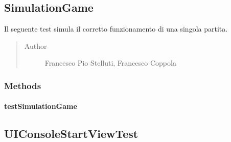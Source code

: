 \documentclass[letterpaper,10pt,italian,openany,oneside]{sphinxmanual}
\begin{document}
\subsection{SimulationGame}
\label{\detokenize{test/it/unicam/cs/pa/mastermind/test/SimulationGame:simulationgame}}\label{\detokenize{test/it/unicam/cs/pa/mastermind/test/SimulationGame::doc}}

\begin{fulllineitems}
\label{\detokenize{test/it/unicam/cs/pa/mastermind/test/SimulationGame:it.unicam.cs.pa.mastermind.test.SimulationGame}}
Il seguente test simula il corretto funzionamento di una singola partita.
\begin{quote}\begin{description}
\item[{Author}] \leavevmode
Francesco Pio Stelluti, Francesco Coppola

\end{description}\end{quote}

\end{fulllineitems}



\subsubsection{Methods}
\label{\detokenize{test/it/unicam/cs/pa/mastermind/test/SimulationGame:methods}}

\paragraph{testSimulationGame}
\label{\detokenize{test/it/unicam/cs/pa/mastermind/test/SimulationGame:testsimulationgame}}

\begin{fulllineitems}
\label{\detokenize{test/it/unicam/cs/pa/mastermind/test/SimulationGame:it.unicam.cs.pa.mastermind.test.SimulationGame.testSimulationGame()}}
\end{fulllineitems}



\subsection{UIConsoleStartViewTest}
\label{\detokenize{test/it/unicam/cs/pa/mastermind/test/UIConsoleStartViewTest:uiconsolestartviewtest}}\label{\detokenize{test/it/unicam/cs/pa/mastermind/test/UIConsoleStartViewTest::doc}}
\end{document}

